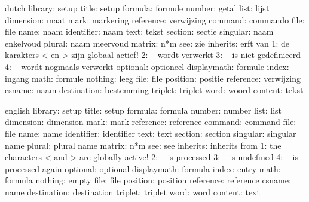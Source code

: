 
%
%

\usemodule[set-02]

\unprotect


\def\setupnumfont  {}
\def\setuptxtfont  {}
\def\setupintfont#1{\uppercase{#1}}
\def\setupvarfont  {\sl}
\def\setupoptfont  {\sl}
\def\setupalwcolor {}
\def\setupoptcolor {darkgray}

  {\ignorespaces}

\startmessages  dutch  library: setup
        title:  setup
      formula:  formule
       number:  getal
         list:  lijst
    dimension:  maat
         mark:  markering
    reference:  verwijzing
      command:  commando
         file:  file
         name:  naam
   identifier:  naam
         text:  tekst
      section:  sectie
     singular:  naam enkelvoud
       plural:  naam meervoud
       matrix:  n*m
          see:  zie
     inherits:  erft van
            1:  de karakters < en > zijn globaal actief!
            2:  -- wordt verwerkt
            3:  -- is niet gedefinieerd
            4:  -- wordt nogmaals verwerkt
     optional:  optioneel
  displaymath:  formule
        index:  ingang
         math:  formule
      nothing:  leeg
         file:  file
     position:  positie
    reference:  verwijzing
       csname:  naam
  destination:  bestemming
      triplet:  triplet
         word:  woord
      content:  tekst
\stopmessages

\startmessages  english  library: setup
        title:  setup
      formula:  formula
       number:  number
         list:  list
    dimension:  dimension
         mark:  mark
    reference:  reference
      command:  command
         file:  file
         name:  name
   identifier:  identifier
         text:  text
      section:  section
     singular:  singular name
       plural:  plural name
       matrix:  n*m
          see:  see
     inherits:  inherits from
            1:  the characters < and > are globally active!
            2:  -- is processed
            3:  -- is undefined
            4:  -- is processed again
     optional:  optional
  displaymath:  formula
        index:  entry
         math:  formula
      nothing:  empty
         file:  file
     position:  position
    reference:  reference
       csname:  name
  destination:  destination
      triplet:  triplet
         word:  word
      content:  text
\stopmessages

